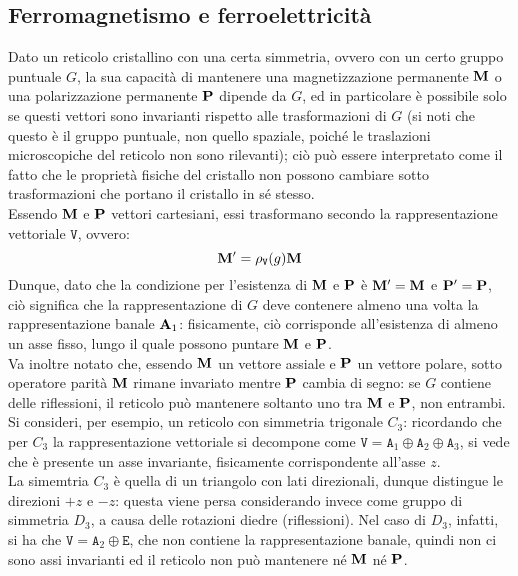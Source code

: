 \subsection{Ferromagnetismo e ferroelettricità}

Dato un reticolo cristallino con una certa simmetria, ovvero con un certo gruppo puntuale $ G $, la sua capacità di mantenere una magnetizzazione permanente $ \mathbf{M} $ o una polarizzazione permanente $ \mathbf{P} $ dipende da $ G $, ed in particolare è possibile solo se questi vettori sono invarianti rispetto alle trasformazioni di $ G $ (si noti che questo è il gruppo puntuale, non quello spaziale, poiché le traslazioni microscopiche del reticolo non sono rilevanti); ciò può essere interpretato come il fatto che le proprietà fisiche del cristallo non possono cambiare sotto trasformazioni che portano il cristallo in sé stesso.\\
Essendo $ \mathbf{M} $ e $ \mathbf{P} $ vettori cartesiani, essi trasformano secondo la rappresentazione vettoriale $ \mathtt{V} $, ovvero:
\begin{equation*}
	\mathbf{M}' = \rho_{\mathtt{V}}(g) \mathbf{M}
\end{equation*}
Dunque, dato che la condizione per l'esistenza di $ \mathbf{M} $ e $ \mathbf{P} $ è $ \mathbf{M}' = \mathbf{M} $ e $ \mathbf{P}' = \mathbf{P} $, ciò significa che la rappresentazione di $ G $ deve contenere almeno una volta la rappresentazione banale $ \mathbf{A}_1 $: fisicamente, ciò corrisponde all'esistenza di almeno un asse fisso, lungo il quale possono puntare $ \mathbf{M} $ e $ \mathbf{P} $.\\
Va inoltre notato che, essendo $ \mathbf{M} $ un vettore assiale e $ \mathbf{P} $ un vettore polare, sotto operatore parità $ \mathbf{M} $ rimane invariato mentre $ \mathbf{P} $ cambia di segno: se $ G $ contiene delle riflessioni, il reticolo può mantenere soltanto uno tra $ \mathbf{M} $ e $ \mathbf{P} $, non entrambi.\\
Si consideri, per esempio, un reticolo con simmetria trigonale $ C_3 $: ricordando che per $ C_3 $ la rappresentazione vettoriale si decompone come $ \mathtt{V} = \mathtt{A}_1 \oplus \mathtt{A}_2 \oplus \mathtt{A}_3 $, si vede che è presente un asse invariante, fisicamente corrispondente all'asse $ z $.\\
La simemtria $ C_3 $ è quella di un triangolo con lati direzionali, dunque distingue le direzioni $ +z $ e $ -z $: questa viene persa considerando invece come gruppo di simmetria $ D_3 $, a causa delle rotazioni diedre (riflessioni). Nel caso di $ D_3 $, infatti, si ha che $ \mathtt{V} = \mathtt{A}_2 \oplus \mathtt{E} $, che non contiene la rappresentazione banale, quindi non ci sono assi invarianti ed il reticolo non può mantenere né $ \mathbf{M} $ né $ \mathbf{P} $.

